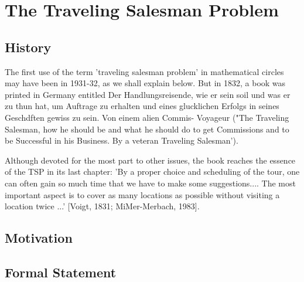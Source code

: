 \chapter{The Traveling Salesman Problem}

    \section{History}

    The first use of the term 'traveling salesman problem' in mathematical
    circles may have been in 1931-32, as we shall explain below. But in 1832, a
    book was printed in Germany entitled Der Handlungsreisende, wie er sein
    soil und was er zu thun hat, um Auftrage zu erhalten und eines glucklichen
    Erfolgs in seines Geschdften gewiss zu sein. Von einem alien Commis-
    Voyageur ("The Traveling Salesman, how he should be and what he should
    do to get Commissions and to be Successful in his Business. By a veteran
    Traveling Salesman'). 
    
    Although devoted for the most part to other issues,
    the book reaches the essence of the TSP in its last chapter: 'By a proper
    choice and scheduling of the tour, one can often gain so much time that we
    have to make some suggestions.... The most important aspect is to cover as
    many locations as possible without visiting a location twice ...' [Voigt, 1831;
    MiMer-Merbach, 1983].

    \section{Motivation}

    \section{Formal Statement}